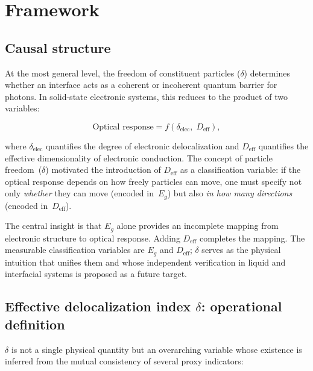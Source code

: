 \documentclass[twocolumn,showpacs,preprintnumbers,amsmath,amssymb,prb]{revtex4-2}
\begin{document}
\section{Framework}
\label{sec:framework}

\subsection{Causal structure}

At the most general level, the freedom of constituent particles
($\delta$) determines whether an interface acts as a coherent or
incoherent quantum barrier for photons. In solid-state electronic
systems, this reduces to the product of two variables:

\begin{equation}
  \text{Optical response} = f\!\left(\delta_\mathrm{elec},\;
  D_\mathrm{eff}\right),
  \label{eq:causal}
\end{equation}

\noindent where $\delta_\mathrm{elec}$ quantifies the degree of
electronic delocalization and $D_\mathrm{eff}$ quantifies the effective
dimensionality of electronic conduction. The concept of particle
freedom~($\delta$) motivated the introduction of $D_\mathrm{eff}$ as a
classification variable: if the optical response depends on how freely
particles can move, one must specify not only \emph{whether} they can
move (encoded in~$E_g$) but also \emph{in how many directions}
(encoded in~$D_\mathrm{eff}$).

The central insight is that $E_g$ alone provides an incomplete mapping
from electronic structure to optical response. Adding $D_\mathrm{eff}$
completes the mapping. The measurable classification variables are
$E_g$ and $D_\mathrm{eff}$; $\delta$ serves as the physical intuition
that unifies them and whose independent verification in liquid and
interfacial systems is proposed as a future target.

\subsection{Effective delocalization index $\delta$: operational definition}

$\delta$ is not a single physical quantity but an overarching variable
whose existence is inferred from the mutual consistency of several proxy
indicators:
\end{document}
